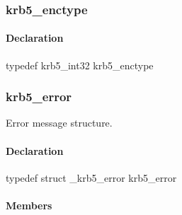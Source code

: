 \documentclass[letterpaper,10pt,english]{sphinxmanual}
\begin{document}
\subsubsection{krb5\_enctype}
\label{appdev/refs/types/krb5_enctype:krb5-enctype-struct}\label{appdev/refs/types/krb5_enctype:krb5-enctype}\label{appdev/refs/types/krb5_enctype::doc}

\begin{fulllineitems}
\label{appdev/refs/types/krb5_enctype:c.krb5_enctype}
\end{fulllineitems}



\paragraph{Declaration}
\label{appdev/refs/types/krb5_enctype:declaration}
typedef krb5\_int32 krb5\_enctype


\subsubsection{krb5\_error}
\label{appdev/refs/types/krb5_error:krb5-error-struct}\label{appdev/refs/types/krb5_error:krb5-error}\label{appdev/refs/types/krb5_error::doc}

\begin{fulllineitems}
\label{appdev/refs/types/krb5_error:c.krb5_error}
\end{fulllineitems}


Error message structure.


\paragraph{Declaration}
\label{appdev/refs/types/krb5_error:declaration}
typedef struct \_krb5\_error  krb5\_error


\paragraph{Members}
\label{appdev/refs/types/krb5_error:members}

\begin{fulllineitems}
\label{appdev/refs/types/krb5_error:c.krb5_error.magic}
\end{fulllineitems}
\end{document}
